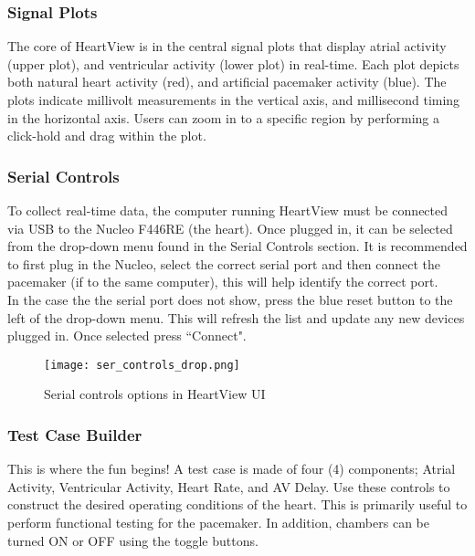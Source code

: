\documentclass[11pt,fleqn]{book} %
\begin{document}
\subsubsection*{Signal Plots}
The core of HeartView is in the central signal plots that display atrial activity (upper plot), and ventricular activity (lower plot) in real-time. Each plot depicts both natural heart activity (red), and artificial pacemaker activity (blue). The plots indicate millivolt measurements in the vertical axis, and millisecond timing in the horizontal axis. Users can zoom in to a specific region by performing a click-hold and drag within the plot. 

\subsubsection*{Serial Controls} \label{sec:serialcontrols}
To collect real-time data, the computer running HeartView must be connected via USB to the Nucleo F446RE (the heart). Once plugged in, it can be selected from the drop-down menu found in the Serial Controls section. It is recommended to first plug in the Nucleo, select the correct serial port and then connect the pacemaker (if to the same computer), this will help identify the correct port. \\

In the case the the serial port does not show, press the blue reset button to the left of the drop-down menu. This will refresh the list and update any new devices plugged in. Once selected press ``Connect". 


\begin{figure}[h]
	\centering\texttt{[image: ser\_controls\_drop.png]}
	\caption{Serial controls options in HeartView UI}
	\label{fig:serial_controls} %
\end{figure}

\subsubsection*{Test Case Builder} 
This is where the fun begins! A test case is made of four (4) components; Atrial Activity, Ventricular Activity, Heart Rate, and AV Delay. Use these controls to construct the desired operating conditions of the heart. This is primarily useful to perform functional testing for the pacemaker. In addition, chambers can be turned ON or OFF using the toggle buttons. \\
\end{document}
